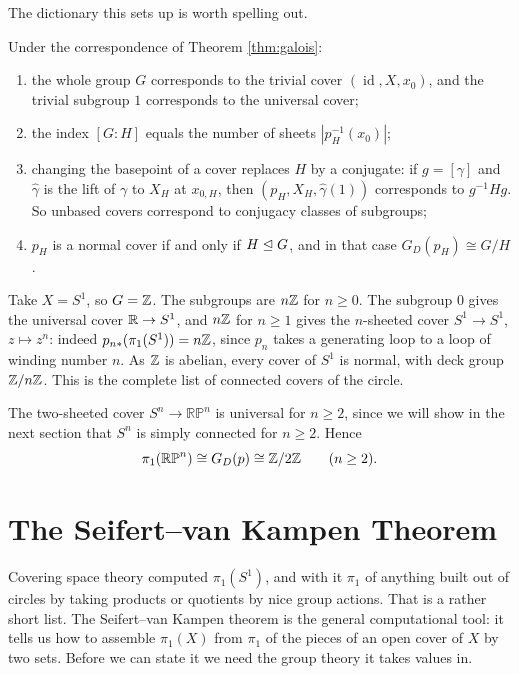 \documentclass[a4paper]{scrartcl}
\newcommand{\id}{\operatorname{id}}
\newcommand{\RP}{\mathbb{RP}}
\begin{document}
The dictionary this sets up is worth spelling out.

\begin{remark} \label{rmk:galois-dictionary}
	Under the correspondence of Theorem \ref{thm:galois}:
	\begin{enumerate}
		\item the whole group $G$ corresponds to the trivial cover $(\id, X, x_0)$, and the trivial subgroup $1$ corresponds to the universal cover;
		\item the index $[G:H]$ equals the number of sheets $|p_H^{-1}(x_0)|$;
		\item changing the basepoint of a cover replaces $H$ by a conjugate: if $g = [\gamma]$ and $\hat\gamma$ is the lift of $\gamma$ to $X_H$ at $x_{0,H}$, then $(p_H, X_H, \hat\gamma(1))$ corresponds to $g^{-1}Hg$. So unbased covers correspond to conjugacy classes of subgroups;
		\item $p_H$ is a normal cover if and only if $H \trianglelefteq G$, and in that case $G_D(p_H) \cong G/H$.
	\end{enumerate}
\end{remark}

\begin{example}
	Take $X = S^1$, so $G = \mathbb{Z}$. The subgroups are $n\mathbb{Z}$ for $n \geq 0$. The subgroup $0$ gives the universal cover $\mathbb{R} \to S^1$, and $n\mathbb{Z}$ for $n \geq 1$ gives the $n$-sheeted cover $S^1 \to S^1$, $z \mapsto z^n$: indeed $p_{n*}(\pi_1(S^1)) = n\mathbb{Z}$, since $p_n$ takes a generating loop to a loop of winding number $n$. As $\mathbb{Z}$ is abelian, every cover of $S^1$ is normal, with deck group $\mathbb{Z}/n\mathbb{Z}$. This is the complete list of connected covers of the circle.
\end{example}

\begin{example}
	The two-sheeted cover $S^n \to \RP^n$ is universal for $n \geq 2$, since we will show in the next section that $S^n$ is simply connected for $n \geq 2$. Hence
	$$
	\pi_1(\RP^n) \cong G_D(p) \cong \Z/2\Z \qquad (n \geq 2).
	$$
\end{example}

\section{The Seifert--van Kampen Theorem}

Covering space theory computed $\pi_1(S^1)$, and with it $\pi_1$ of anything built out of
circles by taking products or quotients by nice group actions. That is a rather short
list. The Seifert--van Kampen theorem is the general computational tool: it tells us how
to assemble $\pi_1(X)$ from $\pi_1$ of the pieces of an open cover of $X$ by two sets.
Before we can state it we need the group theory it takes values in.
\end{document}
